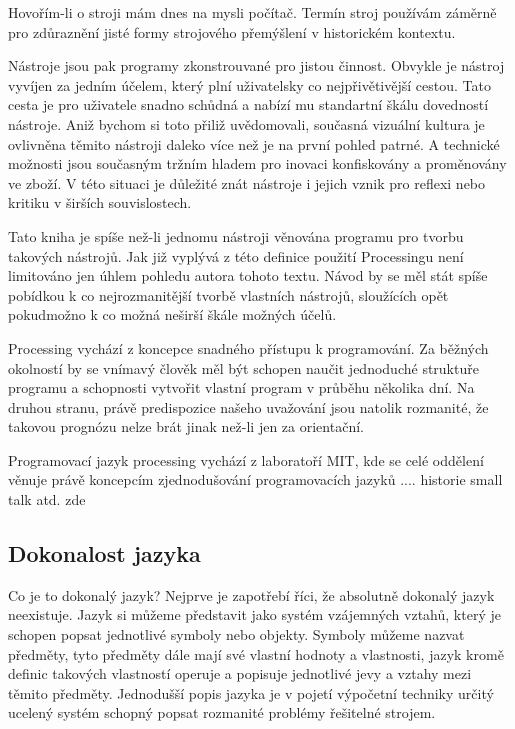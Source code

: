 \documentclass[11pt]{article} %
\begin{document}
Hovořím-li o stroji mám dnes na mysli počítač. Termín stroj používám záměrně pro zdůraznění jisté formy strojového přemýšlení v historickém kontextu.

Nástroje jsou pak programy zkonstrouvané pro jistou činnost. Obvykle je nástroj vyvíjen za jedním účelem, který plní uživatelsky co nejpřivětivější cestou. Tato cesta je pro uživatele snadno schůdná a nabízí mu standartní škálu dovedností nástroje. Aniž bychom si toto přiliž uvědomovali, současná vizuální kultura je ovlivněna těmito nástroji daleko více než je na první pohled patrné. A technické možnosti jsou současným tržním hladem pro inovaci konfiskovány a proměnovány ve zboží. V této situaci je důležité znát nástroje i jejich vznik pro reflexi nebo kritiku v širších souvislostech.

Tato kniha je spíše než-li jednomu nástroji věnována programu pro tvorbu takových nástrojů. Jak již vyplývá z této definice použití Processingu není limitováno jen úhlem pohledu autora tohoto textu. Návod by se měl stát spíše pobídkou k co nejrozmanitější tvorbě vlastních nástrojů, sloužících opět pokudmožno k co možná neširší škále možných účelů.

Processing vychází z koncepce snadného přístupu k programování. Za běžných okolností by se vnímavý člověk měl být schopen naučit jednoduché struktuře programu a schopnosti vytvořit vlastní program v průběhu několika dní. Na druhou stranu, právě predispozice našeho uvažování jsou natolik rozmanité, že takovou prognózu nelze brát jinak než-li jen za orientační.


Programovací jazyk processing vychází z laboratoří MIT, kde se celé oddělení věnuje právě koncepcím zjednodušování programovacích jazyků .... historie small talk atd. zde


\subsection{Dokonalost jazyka}

Co je to dokonalý jazyk? Nejprve je zapotřebí říci, že absolutně dokonalý jazyk neexistuje. Jazyk si můžeme představit jako systém vzájemných vztahů, který je schopen popsat jednotlivé symboly nebo objekty. Symboly můžeme nazvat předměty, tyto předměty dále mají své vlastní hodnoty a vlastnosti, jazyk kromě definic takových vlastností operuje a popisuje jednotlivé jevy a vztahy mezi těmito předměty. Jednodušší popis jazyka je v pojetí výpočetní techniky určitý ucelený systém schopný popsat rozmanité problémy řešitelné strojem.
\end{document}
